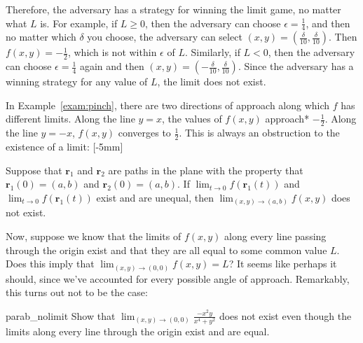 \documentclass{watsonbook}
\begin{document}
\begin{solution}
  Therefore, the adversary has a strategy for winning the limit game,
  no matter what $L$ is. For example, if $L \geq 0$, then the
  adversary can choose $\epsilon = \tfrac{1}{4}$, and then no matter
  which $\delta$ you choose, the adversary can select
  $(x,y) = (\frac{\delta}{10}, \frac{\delta}{10})$. Then
  $f(x,y) = -\tfrac{1}{2}$, which is not within $\epsilon$ of
  $L$. Similarly, if $L < 0$, then the adversary can choose $\epsilon
  = \tfrac{1}{4}$ again and then $(x,y) = (-\frac{\delta}{10},
  \frac{\delta}{10})$. Since the adversary has a winning strategy for any value of
  $L$, the limit does not exist.
\end{solution}

In Example~\ref{exam:pinch}, there are two directions of approach
along which $f$ has different limits. Along the line $y = x$, the
values of $f(x,y)$ approach* $-\tfrac{1}{2}$. Along the line $y = -x$,
$f(x,y)$ converges to $\tfrac{1}{2}$. This is always an obstruction to
the existence of a limit: [-5mm]

\begin{exercise}{}{}
  Suppose that $\mathbf{r}_1$ and $\mathbf{r}_2$ are paths in the
  plane with the property that $\mathbf{r}_1(0) = (a,b)$ and
  $\mathbf{r}_2(0) = (a,b)$. If $\lim_{t \to 0}f(\mathbf{r}_1(t))$ and
  $\lim_{t \to 0}f(\mathbf{r}_1(t))$ exist and are unequal, then
  $\displaystyle{\lim_{(x,y) \to (a,b)} f(x,y)}$ does not exist. 
\end{exercise} \bang{-1.5cm}

Now, suppose we know that the limits of $f(x,y)$ along every line
passing through the origin exist and that they are all equal to some
common value $L$. Does
this imply that $\lim_{(x,y) \to (0,0)}f(x,y) = L$? It seems like
perhaps it should, since we've accounted for every possible angle of
approach. Remarkably, this turns out not to be the case:

\begin{example}{}{parab_nolimit}
  Show that $\lim_{(x,y) \to (0,0)}\frac{-x^2 y }{x^4 + y^2}$ does not
  exist even though the limits along every line through the origin
  exist and are equal. 
\end{example}
\end{document}
